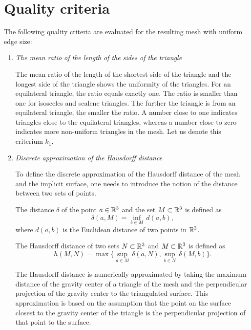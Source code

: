 \section{Quality criteria}
\label{sub4.1}

The following quality criteria \cite{korecova2021triangulation} are evaluated 
for the resulting mesh with uniform edge size:

\begin{enumerate}
    \item \textit{The mean ratio of the length of the sides of the triangle}
    
    The mean ratio of the length of the shortest side of the triangle
    and the longest side of the triangle shows the uniformity of the 
    triangles. 
    For an equilateral triangle, the ratio equals exactly one. The ratio is
    smaller than one for isosceles and scalene triangles. 
    The further the triangle is from an equilateral triangle, the smaller the ratio.
    A number close to one indicates triangles close to the equilateral triangles,
    whereas a number close to zero indicates more non-uniform triangles in the mesh.
    Let us denote this criterium $k_1$.

    \item \textit{Discrete approximation of the Hausdorff distance}
    
    To define the discrete approximation of the Hausdorff distance of the mesh and
    the implicit surface, one needs to introduce the notion of the distance between two sets
    of points.
\begin{definition} The distance $\delta$ of the point $a\in \mathbb{R}^3$ and the set
    $M \subset \mathbb{R}^3$ is defined as 
    \begin{equation}
        \delta(a, M) = \inf_{b \in M} \, d(a, b),
    \end{equation}
    where $d(a, b)$ is the Euclidean distance of two points in $\mathbb{R}^3$. 
\end{definition}
\begin{definition} The Hausdorff distance of two sets $N \subset \mathbb{R}^3$ and
    $M \subset \mathbb{R}^3$ is defined as
    \begin{equation}
        h(M, N) = \max \big \{\sup_{a \in M} \, \delta(a, N), \sup_{b \in N} \, \delta(M, b) \big \}.
    \end{equation}
\end{definition}
    The Hausdorff distance is numerically approximated by taking the maximum distance
    of the gravity center of a triangle of the mesh and the perpendicular projection of
    the gravity center to the triangulated surface.
    This approximation is based on the assumption that the point on the surface
    closest to the gravity center of the triangle is the perpendicular projection of
    that point to the surface.


\end{enumerate}
